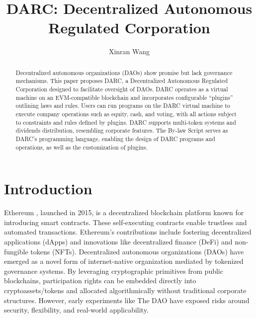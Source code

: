 \documentclass{article}
\title{DARC: Decentralized Autonomous Regulated Corporation}
\author{Xinran Wang}
\begin{document}
\maketitle


\begin{abstract}
Decentralized autonomous organizations (DAOs) show promise but lack governance mechanisms. This paper proposes DARC, a Decentralized Autonomous Regulated Corporation designed to facilitate oversight of DAOs. DARC operates as a virtual machine on an EVM-compatible blockchain and incorporates configurable ``plugins'' outlining laws and rules. Users can run programs on the DARC virtual machine to execute company operations such as equity, cash, and voting, with all actions subject to constraints and rules defined by plugins. DARC supports multi-token systems and dividends distribution, resembling corporate features. The By-law Script serves as DARC's programming language, enabling the design of DARC programs and operations, as well as the customization of plugins.
\end{abstract}

\section{Introduction}


Ethereum \cite{buterin2013ethereum}, launched in 2015, is a decentralized blockchain platform known for introducing smart contracts. These self-executing contracts enable trustless and automated transactions. Ethereum's contributions include fostering decentralized applications (dApps) and innovations like decentralized finance (DeFi) and non-fungible tokens (NFTs). Decentralized autonomous organizations (DAOs)\cite{jentzsch2016decentralized} have emerged as a novel form of internet-native organization mediated by tokenized governance systems. By leveraging cryptographic primitives from public blockchains, participation rights can be embedded directly into cryptoassets/tokens and allocated algorithmically without traditional corporate structures. However, early experiments like The DAO have exposed risks around security, flexibility, and real-world applicability.
\end{document}
